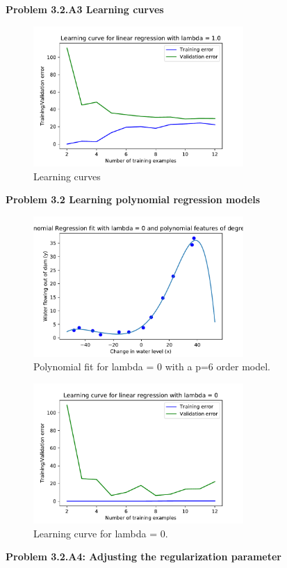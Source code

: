 \documentclass[]{book}
\theoremstyle{definition}
\begin{document}
\textbf{Problem 3.2.A3 Learning curves}
\begin{figure}[H]
	\centering
	\includegraphics[width=8cm]{fig8.pdf}
	\caption{Learning curves}
	\label{fig:8}
\end{figure}

\textbf{Problem 3.2 Learning polynomial regression models}
\begin{figure}[H]
	\centering
	\includegraphics[width=8cm]{fig9.pdf}
	\caption{Polynomial fit for lambda = 0 with a p=6 order model.}
	\label{fig:9}
\end{figure}
\begin{figure}[H]
	\centering
	\includegraphics[width=8cm]{fig10.pdf}
	\caption{Learning curve for lambda = 0.}
	\label{fig:10}
\end{figure}
\textbf{Problem 3.2.A4: Adjusting the regularization parameter}
\end{document}
